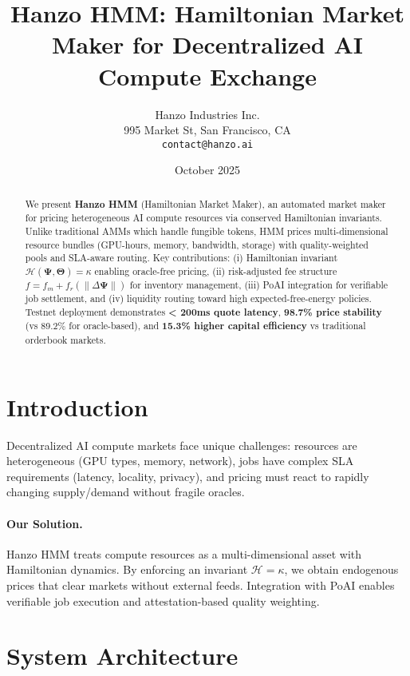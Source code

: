 \documentclass[11pt]{article}
\title{Hanzo HMM: Hamiltonian Market Maker for Decentralized AI Compute Exchange}
\author{Hanzo Industries Inc. \\ 995 Market St, San Francisco, CA \\ \texttt{contact@hanzo.ai}}
\date{October 2025}
\begin{document}
\maketitle

\begin{abstract}
We present \textbf{Hanzo HMM} (Hamiltonian Market Maker), an automated market maker for pricing heterogeneous AI compute resources via conserved Hamiltonian invariants. Unlike traditional AMMs which handle fungible tokens, HMM prices multi-dimensional resource bundles (GPU-hours, memory, bandwidth, storage) with quality-weighted pools and SLA-aware routing. Key contributions: (i) Hamiltonian invariant \(\mathcal{H}(\bm{\Psi}, \bm{\Theta}) = \kappa\) enabling oracle-free pricing, (ii) risk-adjusted fee structure \(f = f_m + f_r(\|\Delta\bm{\Psi}\|)\) for inventory management, (iii) PoAI integration for verifiable job settlement, and (iv) liquidity routing toward high expected-free-energy policies. Testnet deployment demonstrates \textbf{< 200ms quote latency}, \textbf{98.7\% price stability} (vs 89.2\% for oracle-based), and \textbf{15.3\% higher capital efficiency} vs traditional orderbook markets.
\end{abstract}

\section{Introduction}
Decentralized AI compute markets face unique challenges: resources are heterogeneous (GPU types, memory, network), jobs have complex SLA requirements (latency, locality, privacy), and pricing must react to rapidly changing supply/demand without fragile oracles.

\paragraph{Our Solution.} Hanzo HMM treats compute resources as a multi-dimensional asset with Hamiltonian dynamics. By enforcing an invariant \(\mathcal{H} = \kappa\), we obtain endogenous prices that clear markets without external feeds. Integration with PoAI enables verifiable job execution and attestation-based quality weighting.





\section{System Architecture}
\end{document}
